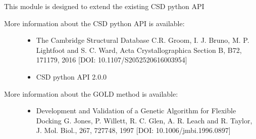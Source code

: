 \documentclass[letterpaper,10pt,english]{sphinxmanual}
\begin{document}
This module is designed to extend the existing CSD python API
\begin{description}
\item[{More information about the CSD python API is available:}] \leavevmode\begin{itemize}
\item {} 
The Cambridge Structural Database C.R. Groom, I. J. Bruno, M. P. Lightfoot and S. C. Ward, Acta Crystallographica Section B, B72, 171\sphinxhyphen{}179, 2016 {[}DOI: 10.1107/S2052520616003954{]}

\item {} 
CSD python API 2.0.0 

\end{itemize}

\item[{More information about the GOLD method is available:}] \leavevmode\begin{itemize}
\item {} 
Development and Validation of a Genetic Algorithm for Flexible Docking G. Jones, P. Willett, R. C. Glen, A. R. Leach and R. Taylor, J. Mol. Biol., 267, 727\sphinxhyphen{}748, 1997 {[}DOI: 10.1006/jmbi.1996.0897{]}

\end{itemize}

\end{description}
\end{document}
